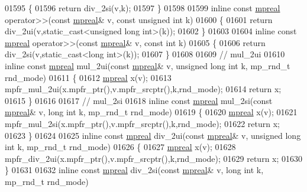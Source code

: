 \begin{DoxyCode}
01595 \{
01596     \textcolor{keywordflow}{return} div\_2si(v,k);
01597 \}
01598 
01599 \textcolor{keyword}{inline} \textcolor{keyword}{const} \hyperlink{classmpfr_1_1mpreal}{mpreal} operator>>(\textcolor{keyword}{const} \hyperlink{classmpfr_1_1mpreal}{mpreal}& v, \textcolor{keyword}{const} \textcolor{keywordtype}{unsigned} \textcolor{keywordtype}{int} k)
01600 \{
01601     \textcolor{keywordflow}{return} div\_2ui(v,static\_cast<unsigned long int>(k));
01602 \}
01603 
01604 \textcolor{keyword}{inline} \textcolor{keyword}{const} \hyperlink{classmpfr_1_1mpreal}{mpreal} operator>>(\textcolor{keyword}{const} \hyperlink{classmpfr_1_1mpreal}{mpreal}& v, \textcolor{keyword}{const} \textcolor{keywordtype}{int} k)
01605 \{
01606     \textcolor{keywordflow}{return} div\_2si(v,static\_cast<long int>(k));
01607 \}
01608 
01609 \textcolor{comment}{// mul\_2ui}
01610 \textcolor{keyword}{inline} \textcolor{keyword}{const} \hyperlink{classmpfr_1_1mpreal}{mpreal} mul\_2ui(\textcolor{keyword}{const} \hyperlink{classmpfr_1_1mpreal}{mpreal}& v, \textcolor{keywordtype}{unsigned} \textcolor{keywordtype}{long} \textcolor{keywordtype}{int} k, mp\_rnd\_t rnd\_mode)
01611 \{
01612     \hyperlink{classmpfr_1_1mpreal}{mpreal} x(v);
01613     mpfr\_mul\_2ui(x.mpfr\_ptr(),v.mpfr\_srcptr(),k,rnd\_mode);
01614     \textcolor{keywordflow}{return} x;
01615 \}
01616 
01617 \textcolor{comment}{// mul\_2si}
01618 \textcolor{keyword}{inline} \textcolor{keyword}{const} \hyperlink{classmpfr_1_1mpreal}{mpreal} mul\_2si(\textcolor{keyword}{const} \hyperlink{classmpfr_1_1mpreal}{mpreal}& v, \textcolor{keywordtype}{long} \textcolor{keywordtype}{int} k, mp\_rnd\_t rnd\_mode)
01619 \{
01620     \hyperlink{classmpfr_1_1mpreal}{mpreal} x(v);
01621     mpfr\_mul\_2si(x.mpfr\_ptr(),v.mpfr\_srcptr(),k,rnd\_mode);
01622     \textcolor{keywordflow}{return} x;
01623 \}
01624 
01625 \textcolor{keyword}{inline} \textcolor{keyword}{const} \hyperlink{classmpfr_1_1mpreal}{mpreal} div\_2ui(\textcolor{keyword}{const} \hyperlink{classmpfr_1_1mpreal}{mpreal}& v, \textcolor{keywordtype}{unsigned} \textcolor{keywordtype}{long} \textcolor{keywordtype}{int} k, mp\_rnd\_t rnd\_mode)
01626 \{
01627     \hyperlink{classmpfr_1_1mpreal}{mpreal} x(v);
01628     mpfr\_div\_2ui(x.mpfr\_ptr(),v.mpfr\_srcptr(),k,rnd\_mode);
01629     \textcolor{keywordflow}{return} x;
01630 \}
01631 
01632 \textcolor{keyword}{inline} \textcolor{keyword}{const} \hyperlink{classmpfr_1_1mpreal}{mpreal} div\_2si(\textcolor{keyword}{const} \hyperlink{classmpfr_1_1mpreal}{mpreal}& v, \textcolor{keywordtype}{long} \textcolor{keywordtype}{int} k, mp\_rnd\_t rnd\_mode)

\end{DoxyCode}
